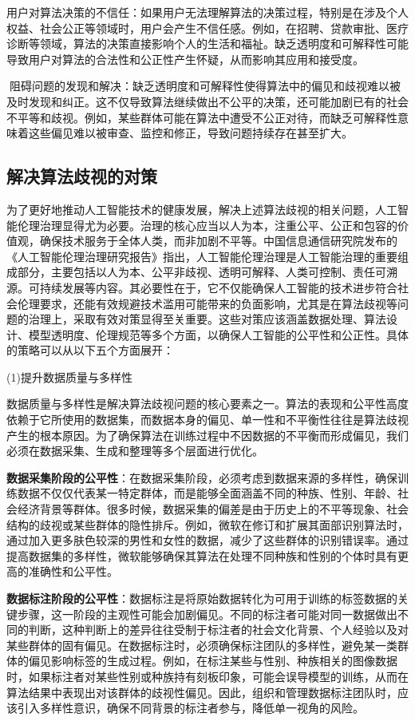 用户对算法决策的不信任：如果用户无法理解算法的决策过程，特别是在涉及个人权益、社会公正等领域时，用户会产生不信任感。例如，在招聘、贷款审批、医疗诊断等领域，算法的决策直接影响个人的生活和福祉。缺乏透明度和可解释性可能导致用户对算法的合法性和公正性产生怀疑，从而影响其应用和接受度。

阻碍问题的发现和解决：缺乏透明度和可解释性使得算法中的偏见和歧视难以被及时发现和纠正。这不仅导致算法继续做出不公平的决策，还可能加剧已有的社会不平等和歧视。例如，某些群体可能在算法中遭受不公正对待，而缺乏可解释性意味着这些偏见难以被审查、监控和修正，导致问题持续存在甚至扩大。


\subsection{解决算法歧视的对策}
为了更好地推动人工智能技术的健康发展，解决上述算法歧视的相关问题，人工智能伦理治理显得尤为必要。治理的核心应当以人为本，注重公平、公正和包容的价值观，确保技术服务于全体人类，而非加剧不平等。中国信息通信研究院发布的《人工智能伦理治理研究报告》指出，人工智能伦理治理是人工智能治理的重要组成部分，主要包括以人为本、公平非歧视、透明可解释、人类可控制、责任可溯源。可持续发展等内容。其必要性在于，它不仅能确保人工智能的技术进步符合社会伦理要求，还能有效规避技术滥用可能带来的负面影响，尤其是在算法歧视等问题的治理上，采取有效对策显得至关重要。这些对策应该涵盖数据处理、算法设计、模型透明度、伦理规范等多个方面，以确保人工智能的公平性和公正性。具体的策略可以从以下五个方面展开：

(1)提升数据质量与多样性

数据质量与多样性是解决算法歧视问题的核心要素之一。算法的表现和公平性高度依赖于它所使用的数据集，而数据本身的偏见、单一性和不平衡性往往是算法歧视产生的根本原因。为了确保算法在训练过程中不因数据的不平衡而形成偏见，我们必须在数据采集、生成和整理等多个层面进行优化。

\textbf{数据采集阶段的公平性}：在数据采集阶段，必须考虑到数据来源的多样性，确保训练数据不仅仅代表某一特定群体，而是能够全面涵盖不同的种族、性别、年龄、社会经济背景等群体。很多时候，数据采集的偏差是由于历史上的不平等现象、社会结构的歧视或某些群体的隐性排斥。例如，微软在修订和扩展其面部识别算法时，通过加入更多肤色较深的男性和女性的数据，减少了这些群体的识别错误率。通过提高数据集的多样性，微软能够确保其算法在处理不同种族和性别的个体时具有更高的准确性和公平性。

\textbf{数据标注阶段的公平性}：数据标注是将原始数据转化为可用于训练的标签数据的关键步骤，这一阶段的主观性可能会加剧偏见。不同的标注者可能对同一数据做出不同的判断，这种判断上的差异往往受制于标注者的社会文化背景、个人经验以及对某些群体的固有偏见。在数据标注时，必须确保标注团队的多样性，避免某一类群体的偏见影响标签的生成过程。例如，在标注某些与性别、种族相关的图像数据时，如果标注者对某些性别或种族持有刻板印象，可能会误导模型的训练，从而在算法结果中表现出对该群体的歧视性偏见。因此，组织和管理数据标注团队时，应该引入多样性意识，确保不同背景的标注者参与，降低单一视角的风险。

